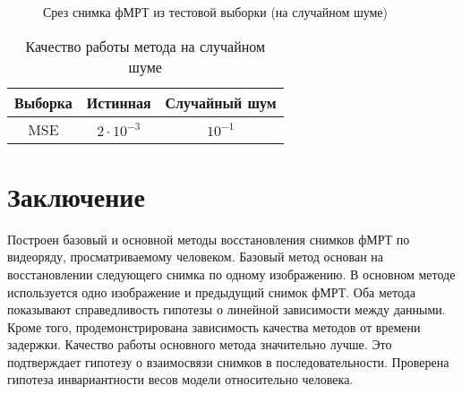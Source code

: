 \documentclass[a4paper, 12pt]{article}
\begin{document}
	\begin{figure}[h!]
		\centering
		\hfill
		\hfill
		\caption{Срез снимка фМРТ из тестовой выборки (на случайном шуме)}
		\label{fig:8}
	\end{figure}

	\begin{table}[h!]
		\centering
		\begin{tabular}{|c|c|c|}
			\hline
			Выборка	&	Истинная	&	Случайный шум \\ \hline \hline
			MSE		& 	$2 \cdot 10^{-3}$	 &		$10^{-1}$ \\ \hline
		\end{tabular}
		\caption{Качество работы метода на случайном шуме}
		\label{table:2}
	\end{table}

\newpage

\section{Заключение}

	Построен базовый и основной методы восстановления снимков фМРТ по видеоряду, просматриваемому
	человеком. Базовый метод основан на восстановлении следующего снимка по одному изображению.
	В основном методе используется одно изображение и предыдущий снимок фМРТ.
	Оба метода показывают справедливость гипотезы о линейной зависимости между данными.
	Кроме того, продемонстрирована зависимость качества методов от времени задержки.
	Качество работы основного метода значительно лучше.
	Это подтверждает гипотезу о взаимосвязи снимков в последовательности.
	Проверена гипотеза инвариантности весов модели относительно человека.

\newpage



\end{document}
